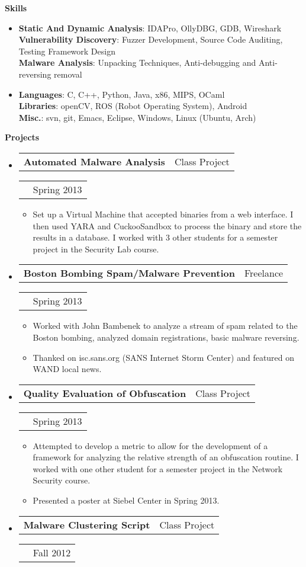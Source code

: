 \documentclass[letterpaper,11pt]{article}
\makeatletter
\newcommand{\resitem}[1]{\item #1 \vspace{-5pt}}
\newcommand{\resheading}[1]{{\large \colorbox{mygrey}{\begin{minipage}{\textwidth}{\textbf{#1 \vphantom{p\^{E}}}}\end{minipage}}}}
\newcommand{\resexperience}[4]
{
  \begin{tabular*}{6.5in}{l@{\extracolsep{\fill}}r}
    \textbf{#1} & \footnotesize{#2}
  \end{tabular*}
  \begin{tabular*}{6.5in}{l@{\extracolsep{\fill}}r}
    \textit{#3} & \footnotesize{#4}
  \end{tabular*}
  \vspace{-8pt}
}
\newcommand{\resskill}[2]
{
  \footnotesize{\textbf{#1}}: \footnotesize{#2}\\
}
\makeatother
\begin{document}
\resheading{Skills}
\begin{itemize}
\item
  \resskill{Static And Dynamic Analysis}{IDAPro, OllyDBG, GDB, Wireshark}
  \resskill{Vulnerability Discovery}{Fuzzer Development, Source Code
    Auditing, Testing Framework Design}
  \resskill{Malware Analysis}{Unpacking Techniques, Anti-debugging and
  Anti-reversing removal}
\item
  \resskill{Languages}{C, C++, Python, Java, x86, MIPS, OCaml}
  \resskill{Libraries}{openCV, ROS (Robot Operating System), Android}
  \resskill{Misc.}{svn, git, Emacs, Eclipse, Windows, Linux (Ubuntu, Arch)}
\end{itemize}

\resheading{Projects}
\begin{itemize}
\item
  \resexperience{Automated Malware Analysis}{Class Project}{}{Spring 2013}
  {\footnotesize
    \begin{itemize}
      \resitem{Set up a Virtual Machine that accepted binaries from a web
  interface.  I then used YARA and CuckooSandbox to process the binary
  and store the results in a database.  I worked with 3 other
  students for a semester project in the Security Lab course.}
    \end{itemize}
  }
\item
  \resexperience{Boston Bombing Spam/Malware Prevention}{Freelance}{}{Spring 2013}
  {\footnotesize
    \begin{itemize}
      \resitem{ Worked with John Bambenek to analyze a stream of spam related
  to the Boston bombing, analyzed domain registrations, basic malware
  reversing.}
      \resitem{Thanked on isc.sans.org (SANS Internet Storm Center) and featured on WAND local news.}
    \end{itemize}
  }
\item
  \resexperience{Quality Evaluation of Obfuscation}{Class Project}{}{Spring 2013}
  {\footnotesize
    \begin{itemize}
      \resitem{Attempted to develop a metric to allow for the development of
  a framework for analyzing the relative strength of an obfuscation
  routine.  I worked with one other student for a semester project in
  the Network Security course.}
      \resitem{Presented a poster at Siebel Center in Spring 2013.}
    \end{itemize}
  }
\item
  \resexperience{Malware Clustering Script}{Class Project}{}{Fall 2012}
  {\footnotesize
}
\end{itemize}
\end{document}
